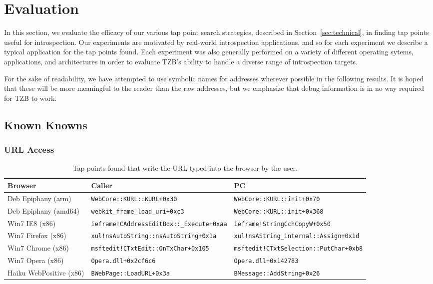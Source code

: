\section{Evaluation}
\label{sec:eval}

In this section, we evaluate the efficacy of our various tap point search
strategies, described in Section~\ref{sec:technical}, in finding tap
points useful for introspection. Our experiments are motivated by
real-world introspection applications, and so for each experiment we
describe a typical application for the tap points found. Each experiment
was also generally performed on a variety of different operating sytems,
applications, and architectures in order to evaluate TZB's ability to
handle a diverse range of introspection targets.

For the sake of readability, we have attempted to use symbolic names for
addresses wherever possible in the following results. It is hoped that
these will be more meaningful to the reader than the raw addresses, but
we emphasize that debug information is in no way required for TZB to
work.

\subsection{Known Knowns}

\subsubsection{URL Access}
\label{sec:eval:subsec:url}

\begin{table*}
    \centering
    \small
    \begin{tabular}{|l|l|l|}
        \hline
        Browser & Caller & PC \\
        \hline
        Deb Epiphany (arm) & \texttt{WebCore::KURL::KURL+0x30} & \texttt{WebCore::KURL::init+0x70} \\
        Deb Epiphany (amd64) & \texttt{webkit\_frame\_load\_uri+0xc3} & \texttt{WebCore::KURL::init+0x368} \\ 
        Win7 IE8 (x86) & \texttt{ieframe!CAddressEditBox::\_Execute+0xaa} & \texttt{ieframe!StringCchCopyW+0x50} \\
        Win7 Firefox (x86) & \texttt{xul!nsAutoString::nsAutoString+0x1a} & \texttt{xul!nsAString\_internal::Assign+0x1d} \\
        Win7 Chrome (x86) &  \texttt{msftedit!CTxtEdit::OnTxChar+0x105} & \texttt{msftedit!CTxtSelection::PutChar+0xb8} \\
        Win7 Opera (x86) &  \texttt{Opera.dll+0x2cf6c6} & \texttt{Opera.dll+0x142783} \\
        Haiku WebPositive (x86) & \texttt{BWebPage::LoadURL+0x3a} & \texttt{BMessage::AddString+0x26} \\
        \hline
    \end{tabular}
\caption{Tap points found that write the URL typed into the browser by
the user.}
\label{tbl:url}
\end{table*}

